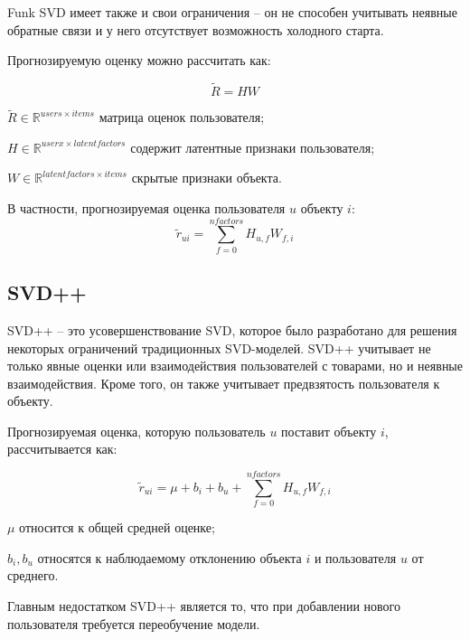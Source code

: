 Funk SVD имеет также и свои ограничения -- он не способен учитывать неявные обратные связи и у него отсутствует возможность холодного старта.

Прогнозируемую оценку можно рассчитать как:

\begin{equation}
	\widetilde{R} = HW
\end{equation}
\begin{eqexpl}[35mm]
\item{$\widetilde{R} \in \mathbb{R}^{users \times items}$} матрица оценок пользователя;
\item{$H \in \mathbb{R}^{userx \times latent factors}$} содержит латентные признаки пользователя;
\item{$W \in \mathbb{R}^{latent factors \times items}$} скрытые признаки объекта.
\end{eqexpl}

В частности, прогнозируемая оценка пользователя $u$ объекту $i$:
\begin{equation}
	\widetilde{r}_{ui} = \sum^{n factors}_{f = 0} H_{u, f} W_{f, i}
\end{equation}

\subsection{SVD++}

SVD++ -- это усовершенствование SVD, которое было разработано для решения некоторых ограничений традиционных SVD-моделей. SVD++ учитывает не только явные оценки или взаимодействия пользователей с товарами, но и неявные взаимодействия. Кроме того, он также учитывает предвзятость пользователя к объекту.

Прогнозируемая оценка, которую пользователь $u$ поставит объекту $i$, рассчитывается как:

\begin{equation}
	\widetilde{r}_{ui} = \mu + b_i + b_u + \sum^{n factors}_{f = 0}{H_{u, f} W_{f, i}}
\end{equation}
\begin{eqexpl}[15mm]
\item{$\mu$} относится к общей средней оценке;
\item{$b_i, b_u$} относятся к наблюдаемому отклонению объекта $i$ и пользователя $u$ от среднего.
\end{eqexpl}

Главным недостатком SVD++ является то, что при добавлении нового пользователя требуется переобучение модели.

\pagebreak